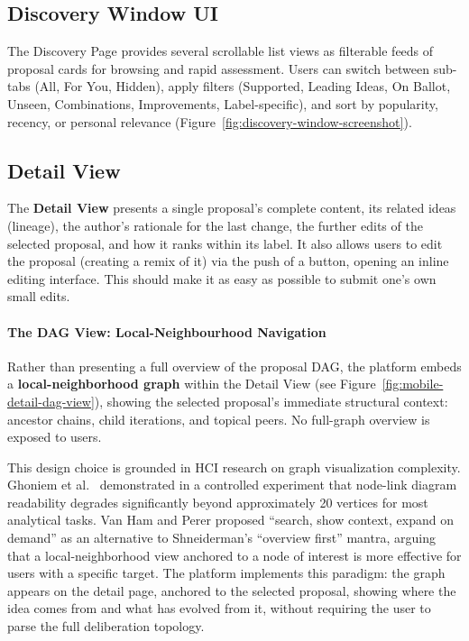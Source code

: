 \documentclass[a4paper, 12pt, twoside]{iviathesis}
\begin{document}
\subsection{Discovery Window UI}

The Discovery Page provides several scrollable list views as filterable feeds of proposal cards for browsing and rapid assessment. Users can switch between sub-tabs (All, For You, Hidden), apply filters (Supported, Leading Ideas, On Ballot, Unseen, Combinations, Improvements, Label-specific), and sort by popularity, recency, or personal relevance (Figure~\ref{fig:discovery-window-screenshot}).

\subsection{Detail View}
The \textbf{Detail View} presents a single proposal's complete content, its related ideas (lineage), the author's rationale for the last change, the further edits of the selected proposal, and how it ranks within its label. It also allows users to edit the proposal (creating a remix of it) via the push of a button, opening an inline editing interface. This should make it as easy as possible to submit one's own small edits.

\paragraph{The DAG View: Local-Neighbourhood Navigation}
\label{sec:graph-view}
Rather than presenting a full overview of the proposal DAG, the platform embeds a \textbf{local-neighborhood graph} within the Detail View (see Figure~\ref{fig:mobile-detail-dag-view}), showing the selected proposal's immediate structural context: ancestor chains, child iterations, and topical peers. No full-graph overview is exposed to users. 

This design choice is grounded in HCI research on graph visualization complexity. Ghoniem et al.\ \cite{ghoniem2005readability} demonstrated in a controlled experiment that node-link diagram readability degrades significantly beyond approximately 20 vertices for most analytical tasks. Van Ham and Perer \cite{vanham2009search} proposed ``search, show context, expand on demand'' as an alternative to Shneiderman's \cite{shneiderman1996eyes} ``overview first'' mantra, arguing that a local-neighborhood view anchored to a node of interest is more effective for users with a specific target. The platform implements this paradigm: the graph appears on the detail page, anchored to the selected proposal, showing where the idea comes from and what has evolved from it, without requiring the user to parse the full deliberation topology.
\end{document}
